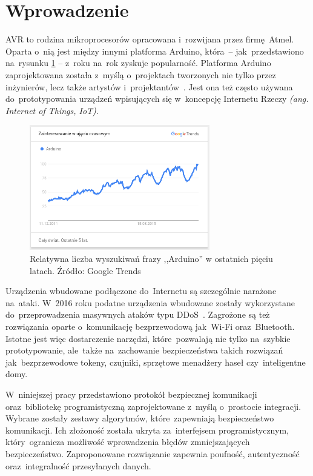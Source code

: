 \chapter*{Wprowadzenie}
\label{cha:wstep}

AVR to rodzina mikroprocesorów opracowana i~rozwijana przez firmę Atmel. Oparta o~nią jest między innymi platforma Arduino, która~-- jak~przedstawiono na~rysunku \ref{fig:arduinotrends} -- z~roku na~rok zyskuje popularność. Platforma Arduino zaprojektowana została z~myślą o~projektach tworzonych nie tylko przez inżynierów, lecz także artystów i~projektantów~\cite{BanShi14}. Jest ona też często używana do~prototypowania urządzeń wpisujących się w~koncepcję Internetu Rzeczy \emph{(ang. Internet of Things, IoT)}.

\begin{figure}[h]
\centering
\includegraphics[width=0.7\textwidth]{images/arduino-trends.png}
\caption{Relatywna liczba wyszukiwań frazy ,,Arduino'' w ostatnich pięciu latach. Źródło: Google Trends}
\label{fig:arduinotrends}
\end{figure}

Urządzenia wbudowane podłączone do~Internetu są szczególnie narażone na~ataki. W~2016 roku podatne urządzenia wbudowane zostały wykorzystane do~przeprowadzenia masywnych ataków typu DDoS~\cite{AkaIOT}. Zagrożone są też rozwiązania oparte o~komunikację bezprzewodową jak~Wi-Fi oraz~Bluetooth. Istotne jest więc dostarczenie narzędzi, które~pozwalają nie tylko na~szybkie prototypowanie, ale~także na~zachowanie bezpieczeństwa takich rozwiązań jak~bezprzewodowe tokeny, czujniki, sprzętowe menadżery haseł czy~inteligentne domy.

W~niniejszej pracy przedstawiono protokół bezpiecznej komunikacji oraz~bibliotekę programistyczną zaprojektowane z~myślą o~prostocie integracji. Wybrane zostały zestawy algorytmów, które~zapewniają bezpieczeństwo komunikacji. Ich złożoność została ukryta za~interfejsem programistycznym, który~ogranicza możliwość wprowadzenia błędów zmniejszających bezpieczeństwo. Zaproponowane rozwiązanie zapewnia poufność, autentyczność oraz~integralność przesyłanych danych.

